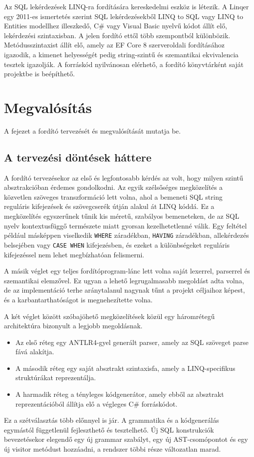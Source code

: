 \documentclass[a4paper,12pt]{article}
\begin{document}
Az SQL lekérdezések LINQ-ra fordítására kereskedelmi eszköz is létezik. A Linqer \cite{linqer} egy 2011-es ismertetés \cite{selmani2011linqer} szerint SQL lekérdezésekből LINQ to SQL vagy LINQ to Entities modellhez illeszkedő, C\# vagy Visual Basic nyelvű kódot állít elő, lekérdezési szintaxisban. A jelen fordító ettől több szempontból különbözik. Metódusszintaxist állít elő, amely az EF Core 8 szerveroldali fordításához igazodik, a kimenet helyességét pedig string-szintű és szemantikai ekvivalencia tesztek igazolják. A forráskód nyilvánosan elérhető, a fordító könyvtárként saját projektbe is beépíthető.

\section{Megvalósítás}

A fejezet a fordító tervezését és megvalósítását mutatja be.

\subsection{A tervezési döntések háttere}

A fordító tervezésekor az első és legfontosabb kérdés az volt, hogy milyen szintű absztrakcióban érdemes gondolkodni. Az egyik szélsőséges megközelítés a közvetlen szöveges transzformáció lett volna, ahol a bemeneti SQL string reguláris kifejezések és szövegcserék útján alakul át LINQ kóddá. Ez a megközelítés egyszerűnek tűnik kis méretű, szabályos bemeneteken, de az SQL nyelv kontextusfüggő természete miatt gyorsan kezelhetetlenné válik. Egy feltétel például másképpen viselkedik \texttt{WHERE} záradékban, \texttt{HAVING} záradékban, allekérdezés belsejében vagy \texttt{CASE WHEN} kifejezésben, és ezeket a különbségeket reguláris kifejezéssel nem lehet megbízhatóan felismerni.

A másik véglet egy teljes fordítóprogram-lánc lett volna saját lexerrel, parserrel és szemantikai elemzővel. Ez ugyan a lehető legrugalmasabb megoldást adta volna, de az implementáció terhe aránytalanul nagynak tűnt a projekt céljaihoz képest, és a karbantarthatóságot is megnehezítette volna.

A két véglet között szóbajöhető megközelítések közül egy háromrétegű architektúra bizonyult a legjobb megoldásnak.
\begin{itemize}
\item Az első réteg egy ANTLR4-gyel generált parser, amely az SQL szöveget parse fává alakítja.
\item A második réteg egy saját absztrakt szintaxisfa, amely a LINQ-specifikus struktúrákat reprezentálja.
\item A harmadik réteg a tényleges kódgenerátor, amely ebből az absztrakt reprezentációból állítja elő a végleges C\# forráskódot.
\end{itemize}
Ez a szétválasztás több előnnyel is jár. A grammatika és a kódgenerálás egymástól függetlenül fejleszthető és tesztelhető. Új SQL konstrukciók bevezetésekor elegendő egy új grammar szabályt, egy új AST-csomópontot és egy új visitor metódust hozzáadni, a rendszer többi része változatlan marad.
\end{document}
